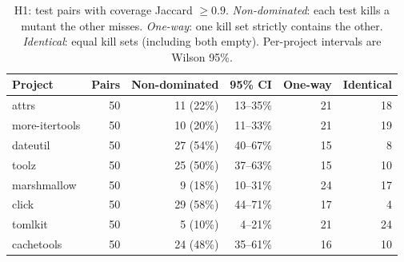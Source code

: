 \begin{table}[t]
\centering\small
\begin{tabular}{lrrrrr}
\toprule
Project & Pairs & Non-dominated & 95\% CI & One-way & Identical \\
\midrule
attrs & 50 & 11 (22\%) & 13--35\% & 21 & 18 \\
more-itertools & 50 & 10 (20\%) & 11--33\% & 21 & 19 \\
dateutil & 50 & 27 (54\%) & 40--67\% & 15 & 8 \\
toolz & 50 & 25 (50\%) & 37--63\% & 15 & 10 \\
marshmallow & 50 & 9 (18\%) & 10--31\% & 24 & 17 \\
click & 50 & 29 (58\%) & 44--71\% & 17 & 4 \\
tomlkit & 50 & 5 (10\%) & 4--21\% & 21 & 24 \\
cachetools & 50 & 24 (48\%) & 35--61\% & 16 & 10 \\
\bottomrule
\end{tabular}
\caption{H1: test pairs with coverage Jaccard $\geq 0.9$. \emph{Non-dominated}: each test kills a mutant the other misses. \emph{One-way}: one kill set strictly contains the other. \emph{Identical}: equal kill sets (including both empty). Per-project intervals are Wilson 95\%.}
\label{tab:h1}
\end{table}
